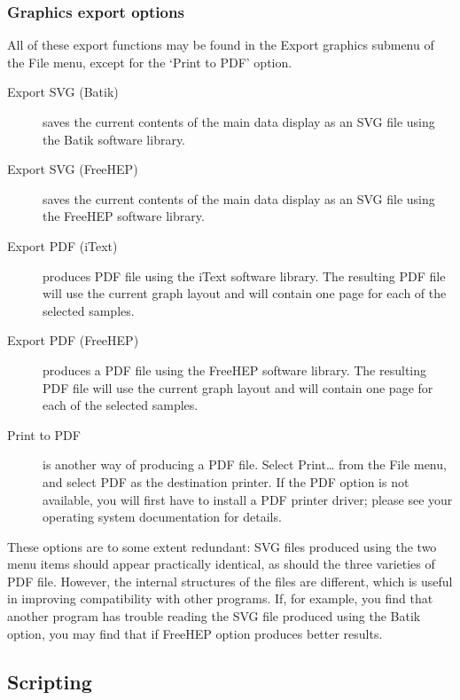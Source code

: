 \documentclass[a4paper,british]{article}
\newcommand{\ppcmd}[1]{\textsf{#1}} %
\newcommand{\caps}[1]{\MakeTextUppercase{#1}} %
\begin{document}
\subsubsection{Graphics export options}

All of these export functions may be found in the \ppcmd{Export graphics}
submenu of the \ppcmd{File} menu, except for the ‘Print to PDF’ option.

\begin{description}

\item[Export SVG (Batik)] saves the current contents of the main
  data display as an \caps{svg} file using the Batik software
  library.

\item[Export SVG (FreeHEP)] saves the current contents of the main
  data display as an \caps{svg} file using the FreeHEP software
  library.

\item[Export PDF (iText)] produces \caps{pdf} file using the iText software
  library. The resulting \caps{pdf} file will use the current graph layout
  and will contain one page for each of the selected samples.

\item[Export PDF (FreeHEP)] produces a \caps{pdf} file using the FreeHEP
  software library. The resulting \caps{pdf} file will use the current graph
  layout and will contain one page for each of the selected samples.

\item[Print to PDF] is another way of producing a PDF file. Select
  \ppcmd{Print\ldots} from the \ppcmd{File} menu, and select \ppcmd{PDF} as
  the destination printer. If the PDF option is not available, you will
  first have to install a PDF printer driver; please see your operating
  system documentation for details.

\end{description}

These options are to some extent redundant: SVG files produced using the two
menu items should appear practically identical, as should the three varieties
of PDF file. However, the internal structures of the files are different,
which is useful in improving compatibility with other programs. If, for
example, you find that another program has trouble reading the SVG file
produced using the Batik option, you may find that if FreeHEP option 
produces better results.

\subsection{\label{sec:scripting}Scripting}
\end{document}
